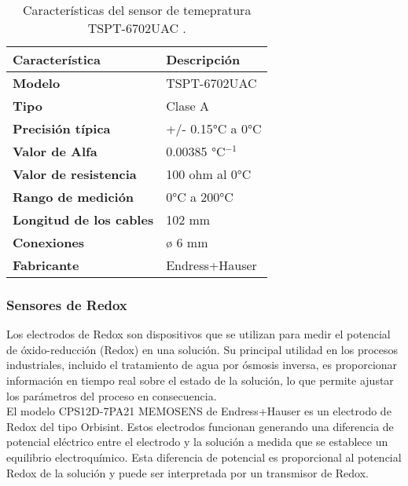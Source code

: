 \begin{table}[H]
    \centering
    \caption{Características del sensor de temepratura TSPT-6702UAC .}
    \label{table:sensor_temperatura}
    \begin{tabular}{| L{6cm} | L{6cm} |}
        \hline
        \textbf{Característica} & \textbf{Descripción}  \\
        \hline
        \textbf{Modelo} & TSPT-6702UAC  \\
        \hline
        \textbf{Tipo} & Clase A  \\
        \hline
        \textbf{Precisión típica} & +/- 0.15°C a 0°C  \\
        \hline
        \textbf{Valor de Alfa} & 0.00385 °C$^{-1}$ \\
        \hline
        \textbf{Valor de resistencia} & 100 ohm al 0°C  \\
        \hline
        \textbf{Rango de medición} & 0°C a 200°C  \\
        \hline
        \textbf{Longitud de los cables} & 102 mm  \\
        \hline
        \textbf{Conexiones} & ø 6 mm  \\
        \hline
        \textbf{Fabricante} & Endress+Hauser  \\
        \hline
    \end{tabular}
\end{table}

\subsubsection{Sensores de Redox}

Los electrodos de Redox son dispositivos que se utilizan para medir el potencial de óxido-reducción (Redox) en una solución. Su principal utilidad en los procesos industriales, incluido el tratamiento de agua por ósmosis inversa, es proporcionar información en tiempo real sobre el estado de la solución, lo que permite ajustar los parámetros del proceso en consecuencia.\\

El modelo CPS12D-7PA21 MEMOSENS de Endress+Hauser es un electrodo de Redox del tipo Orbisint. Estos electrodos funcionan generando una diferencia de potencial eléctrico entre el electrodo y la solución a medida que se establece un equilibrio electroquímico. Esta diferencia de potencial es proporcional al potencial Redox de la solución y puede ser interpretada por un transmisor de Redox.\\

